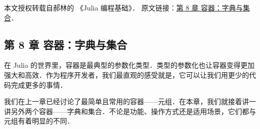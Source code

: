 
本文授权转载自郝林的 《Julia 编程基础》． 原文链接：\href{https://github.com/hyper0x/JuliaBasics/blob/master/book/ch08.md}{第 8 章 容器：字典与集合}．


\subsection{第 8 章 容器：字典与集合}

在 Julia 的世界里，容器是最典型的参数化类型．类型的参数化也让容器变得更加强大和高效．作为程序开发者，我们最直观的感受就是，它可以让我们用更少的代码完成更多的事情．

我们在上一章已经讨论了最简单且常用的容器——元组．在本章，我们就接着讲一讲另外两个容器——字典和集合．不论是功能、操作方式还是适用场景，它们都与元组有着明显的不同．
